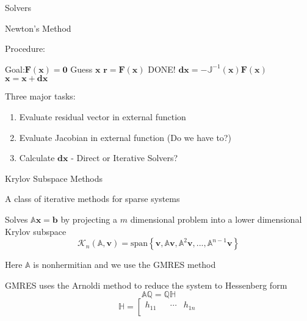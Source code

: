 \documentclass{beamer}
\begin{document}
\begin{section}{Solvers}
\begin{frame}{Newton's Method}
\begin{block}{Procedure:}
\begin{algorithmic}[1]
  \color{blue}
  \STATE Goal:$\mathbf{F}\left(\mathbf{x}\right) = \mathbf{0}$
  \color{black}
  \STATE Guess $\mathbf{x}$
    \STATE $\mathbf{r} = \mathbf{F}\left(\mathbf{x}\right)$
     \STATE DONE! \ENDIF
    \STATE $\mathbf{dx} = -\mathbb{J}^{-1}\left(\mathbf{x}\right)\mathbf{F}\left(\mathbf{x}\right)$
    \STATE $\mathbf{x} = \mathbf{x} + \mathbf{dx}$
  \ENDFOR
\end{algorithmic}
\end{block}
Three major tasks:
\begin{enumerate}
  \item Evaluate residual vector in external function
  \item Evaluate Jacobian in external function (Do we have to?)
  \item Calculate $\mathbf{dx}$ - Direct or Iterative Solvers?
\end{enumerate}
\end{frame}
\begin{frame}{Krylov Subspace Methods}
\begin{customlist}{2ex}{0pt}
  \item A class of iterative methods for sparse systems
  \item Solves $\mathbb{A}\mathbf{x}=\mathbf{b}$ by projecting a $m$ dimensional problem into a lower dimensional Krylov subspace
  \[
   \mathcal{K}_{n}\left(\mathbb{A},\mathbf{v}\right)=\mathrm{span}\left\{ \mathbf{v},\mathbb{A}\mathbf{v},\mathbb{A}^{2}\mathbf{v},...,\mathbb{A}^{n-1}\mathbf{v}\right\} 
  \]
  \item Here $\mathbb{A}$ is nonhermitian and we use the GMRES method
  \item GMRES uses the Arnoldi method to reduce the system to Hessenberg form
  \[
   \mathbb{A}\mathbb{Q}=\mathbb{Q}\mathbb{H}
  \]
  \[
   \mathbb{H}=\left[\begin{array}{cccc}
    h_{11} &  & \cdots & h_{1n}\\

\end{array}\]
\end{customlist}
\end{frame}
\end{section}
\end{document}
